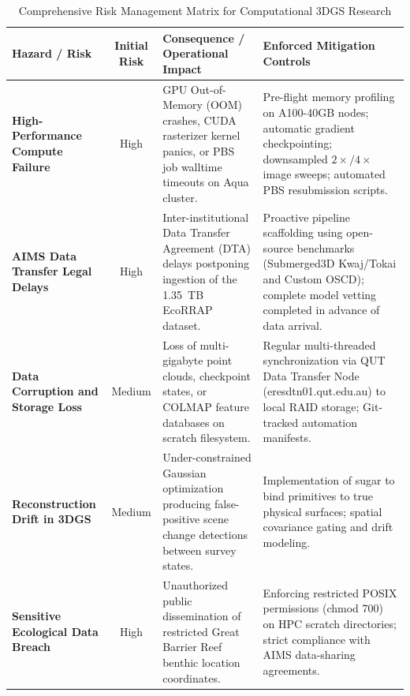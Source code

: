 \begin{table}[htbp]
\centering
\small
\caption{Comprehensive Risk Management Matrix for Computational 3DGS Research}
\label{tab:risk_matrix}
\begin{tabularx}{\textwidth}{p{2.8cm} c p{4.2cm} X}
\toprule
\textbf{Hazard / Risk} & \textbf{Initial Risk} & \textbf{Consequence / Operational Impact} & \textbf{Enforced Mitigation Controls} \\
\midrule
\textbf{High-Performance Compute Failure} & High & GPU Out-of-Memory (OOM) crashes, CUDA rasterizer kernel panics, or PBS job walltime timeouts on Aqua cluster. & Pre-flight memory profiling on A100-40GB nodes; automatic gradient checkpointing; downsampled $2\times/4\times$ image sweeps; automated PBS resubmission scripts. \\
\addlinespace
\textbf{AIMS Data Transfer Legal Delays} & High & Inter-institutional Data Transfer Agreement (DTA) delays postponing ingestion of the 1.35~TB EcoRRAP dataset. & Proactive pipeline scaffolding using open-source benchmarks (Submerged3D Kwaj/Tokai and Custom OSCD); complete model vetting completed in advance of data arrival. \\
\addlinespace
\textbf{Data Corruption and Storage Loss} & Medium & Loss of multi-gigabyte point clouds, checkpoint states, or COLMAP feature databases on scratch filesystem. & Regular multi-threaded synchronization via QUT Data Transfer Node (eresdtn01.qut.edu.au) to local RAID storage; Git-tracked automation manifests. \\
\addlinespace
\textbf{Reconstruction Drift in 3DGS} & Medium & Under-constrained Gaussian optimization producing false-positive scene change detections between survey states. & Implementation of \gls{sugar} to bind primitives to true physical surfaces; spatial covariance gating and drift modeling. \\
\addlinespace
\textbf{Sensitive Ecological Data Breach} & High & Unauthorized public dissemination of restricted Great Barrier Reef benthic location coordinates. & Enforcing restricted POSIX permissions (chmod 700) on HPC scratch directories; strict compliance with AIMS data-sharing agreements. \\
\bottomrule
\end{tabularx}
\end{table}

